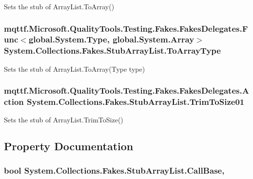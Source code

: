 Sets the stub of Array\-List.\-To\-Array()

\hypertarget{class_system_1_1_collections_1_1_fakes_1_1_stub_array_list_a77291cfa69a983b7a811e4872d644d57}{
\subsubsection[{To\-Array\-Type}]{\setlength{\rightskip}{0pt plus 5cm}mqttf.\-Microsoft.\-Quality\-Tools.\-Testing.\-Fakes.\-Fakes\-Delegates.\-Func$<$global.\-System.\-Type, global.\-System.\-Array$>$ System.\-Collections.\-Fakes.\-Stub\-Array\-List.\-To\-Array\-Type}}\label{class_system_1_1_collections_1_1_fakes_1_1_stub_array_list_a77291cfa69a983b7a811e4872d644d57}


Sets the stub of Array\-List.\-To\-Array(\-Type type)

\hypertarget{class_system_1_1_collections_1_1_fakes_1_1_stub_array_list_aa47a51b80cc7c4740e3e243038df673d}{
\subsubsection[{Trim\-To\-Size01}]{\setlength{\rightskip}{0pt plus 5cm}mqttf.\-Microsoft.\-Quality\-Tools.\-Testing.\-Fakes.\-Fakes\-Delegates.\-Action System.\-Collections.\-Fakes.\-Stub\-Array\-List.\-Trim\-To\-Size01}}\label{class_system_1_1_collections_1_1_fakes_1_1_stub_array_list_aa47a51b80cc7c4740e3e243038df673d}


Sets the stub of Array\-List.\-Trim\-To\-Size()



\subsection{Property Documentation}
\hypertarget{class_system_1_1_collections_1_1_fakes_1_1_stub_array_list_af47214b1d6c11c38c01cbb4946e685b1}{
\subsubsection[{Call\-Base}]{\setlength{\rightskip}{0pt plus 5cm}bool System.\-Collections.\-Fakes.\-Stub\-Array\-List.\-Call\-Base\hspace{0.3cm}{\ttfamily [get]}, {\ttfamily [set]}}}\label{class_system_1_1_collections_1_1_fakes_1_1_stub_array_list_af47214b1d6c11c38c01cbb4946e685b1}


